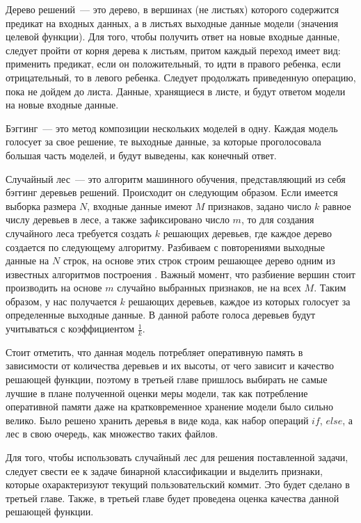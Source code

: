 Дерево решений~--- это дерево, в вершинах (не листьях) которого содержится предикат на входных данных, а в листьях выходные данные модели (значения целевой функции). Для того, чтобы получить ответ на новые входные данные, следует пройти от корня дерева к листьям, притом каждый переход имеет вид: применить предикат, если он положительный, то идти в правого ребенка, если отрицательный, то в левого ребенка. Следует продолжать приведенную операцию, пока не дойдем до листа. Данные, хранящиеся в листе, и будут ответом модели на новые входные данные.

Бэггинг~--- это метод композиции нескольких моделей в одну. Каждая модель голосует за свое решение, те выходные данные, за которые проголосовала большая часть моделей, и будут выведены, как конечный ответ.

Случайный лес~--- это алгоритм машинного обучения, представляющий из себя бэггинг деревьев решений. Происходит он следующим образом. Если имеется выборка размера $N$, входные данные имеют $M$ признаков, задано число $k$ равное числу деревьев в лесе, а также зафиксировано число $m$, то для создания случайного леса требуется создать $k$ решающих деревьев, где каждое дерево создается по следующему алгоритму. Разбиваем с повторениями выходные данные на $N$ строк, на основе этих строк строим решающее дерево одним из известных алгоритмов построения \cite{decision-tree}. Важный момент, что разбиение вершин стоит производить на основе $m$ случайно выбранных признаков, не на всех $M$. Таким образом, у нас получается $k$ решающих деревьев, каждое из которых голосует за определенные выходные данные. В данной работе голоса деревьев будут учитываться с коэффициентом $\frac{1}{k}$.

Стоит отметить, что данная модель потребляет оперативную память в зависимости от количества деревьев и их высоты, от чего зависит и качество решающей функции, поэтому в третьей главе пришлось выбирать не самые лучшие в плане полученной оценки меры модели, так как потребление оперативной памяти даже на кратковременное хранение модели было сильно велико. Было решено хранить деревья в виде кода, как набор операций $if$, $else$, а лес в свою очередь, как множество таких файлов.

Для того, чтобы использовать случайный лес для решения поставленной задачи, следует свести ее к задаче бинарной классификации и выделить признаки, которые охарактеризуют текущий пользовательский коммит. Это будет сделано в третьей главе. Также, в третьей главе будет проведена оценка качества данной решающей функции.

